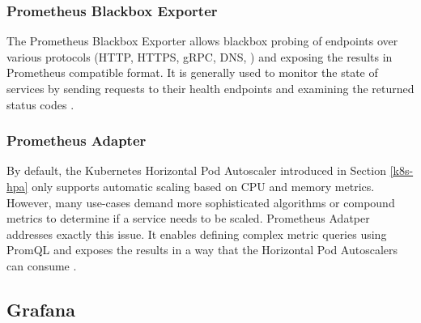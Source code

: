 \subsubsection{Prometheus Blackbox Exporter}

The Prometheus Blackbox Exporter allows blackbox probing of endpoints over various protocols (HTTP, HTTPS, gRPC, DNS, \etc) and exposing the results in Prometheus compatible format. It is generally used to monitor the state of services by sending requests to their health endpoints and examining the returned status codes \cite{PrometheusBlackboxExporter}. 


\subsubsection{Prometheus Adapter}

By default, the Kubernetes Horizontal Pod Autoscaler introduced in Section \ref{k8s-hpa} only supports automatic scaling based on CPU and memory metrics. However, many use-cases demand more sophisticated algorithms or compound metrics to determine if a service needs to be scaled. Prometheus Adatper addresses exactly this issue. It enables defining complex metric queries using PromQL and exposes the results in a way that the Horizontal Pod Autoscalers can consume \cite{PrometheusAdapter}.

\subsection{Grafana}

